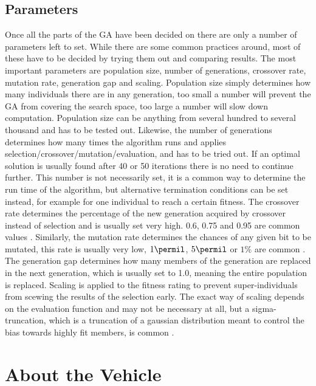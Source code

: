 \subsection{Parameters}
\label{sec:parameters}

Once all the parts of the GA have been decided on there are only a number of parameters left to set. While there are some common practices around, most of these have to be decided by trying them out and comparing results. The most important parameters are population size, number of generations, crossover rate, mutation rate, generation gap and scaling. Population size simply determines how many individuals there are in any generation, too small a number will prevent the GA from covering the search space, too large a number will slow down computation. Population size can be anything from several hundred to several thousand and has to be tested out. Likewise, the number of generations determines how many times the algorithm runs and applies selection/crossover/mutation/evaluation, and has to be tried out. If an optimal solution is usually found after 40 or 50 iterations there is no need to continue further. This number is not necessarily set, it is a common way to determine the run time of the algorithm, but alternative termination conditions can be set instead, for example for one individual to reach a certain fitness. The crossover rate determines the percentage of the new generation acquired by crossover instead of selection and is usually set very high. 0.6, 0.75 and 0.95 are common values \cite{20, 22,24}. Similarly, the mutation rate determines the chances of any given bit to be mutated, this rate is usually very low, $1\permil$, $5\permil$ or $1\%$ are common \cite{20,23,24}. The generation gap determines how many members of the generation are replaced in the next generation, which is usually set to 1.0, meaning the entire population is replaced. Scaling is applied to the fitness rating to prevent super-individuals from scewing the results of the selection early. The exact way of scaling depends on the evaluation function and may not be necessary at all, but a sigma-truncation, which is a truncation of a gaussian distribution meant to control the bias towards highly fit members, is common \cite{26}.

\section{About the Vehicle}
\label{sec:previous_knowledge_vehicle}

